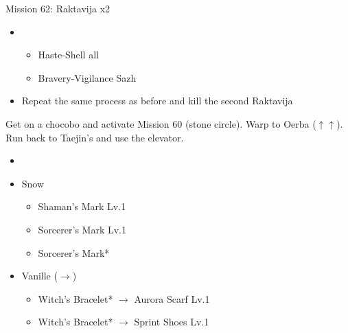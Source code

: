 \begin{battle}{Mission 62: Raktavija x2}
\begin{itemize}
			\begin{itemize}
				\item Blitz-Blitz
				\item Repeat, refreshing with [2] until the first Raktavija is dead 
			\end{itemize}
		\item \fifth
			\begin{itemize}
				\item Haste-Shell all
				\item Bravery-Vigilance Sazh
			\end{itemize}
		\item Repeat the same process as before and kill the second Raktavija
	\end{itemize}
\end{battle}

Get on a chocobo and activate Mission 60 (stone circle).
Warp to Oerba ($\uparrow\uparrow$).
Run back to Taejin's and use the elevator.
\vfill
\begin{menu}
	\begin{itemize}
	\paradigm
		\begin{itemize}
			\item {}%
				{\paradigmline{\com}{(\com)}{(\com)}}%
				{\paradigmline{(\rav)}{\rav}{\med}}%
				{\paradigmline{(\com)}{(\com)}{\med}}%
				{\paradigmline{\com}{\sen}{\med}}%
				{\paradigmline{\syn}{\sen}{(\sab)}}%
				{\paradigmline[4]{\rav}{\rav}{\sab}}%
		\end{itemize}
	\equip
		\begin{itemize}
			\item Snow
				\begin{itemize}
					\item Shaman's Mark Lv.1
					\item Sorcerer's Mark Lv.1
					\item Sorcerer's Mark*
				\end{itemize}
			\item Vanille ($\rightarrow$)
				\begin{itemize}
					\item Witch's Bracelet* $\rightarrow$ Aurora Scarf Lv.1
					\item Witch's Bracelet* $\rightarrow$ Sprint Shoes Lv.1
				\end{itemize}
		\end{itemize}
	\end{itemize}
\end{menu}

